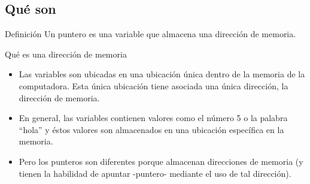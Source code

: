 \documentclass[xcolor=table,spanish,9pt]{beamer}
\begin{document}


\subsection{Qué son}

\begin{frame}[fragile]
  \begin{alertblock}{Definición}
    Un puntero es una variable que almacena una dirección de memoria.
  \end{alertblock}
  \begin{block}{Qué es una dirección de memoria}
    \begin{itemize}
      \item Las variables son ubicadas en una ubicación única dentro de la memoria de la computadora. Esta única ubicación tiene asociada una única dirección, 
	    la dirección de memoria.
      \item En general, las variables contienen valores como el número 5 o la palabra ``hola'' y éstos valores son almacenados en una ubicación específica en la memoria.
      \item Pero los punteros son diferentes porque almacenan direcciones de memoria (y tienen la habilidad de apuntar -puntero- mediante el uso de tal dirección).
    \end{itemize}
  \end{block}
\end{frame}
\end{document}
